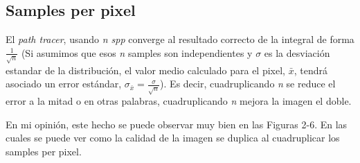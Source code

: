 \documentclass{article}
\begin{document}
\subsection{Samples per pixel}

El \textit{path tracer}, usando \textit{n spp} converge al resultado correcto de
la integral de forma \(\frac{1}{\sqrt{n}}\) (Si asumimos que esos \textit{n}
samples son independientes y \(\sigma\) es la desviación estandar de la
distribución, el valor medio calculado para el pixel, \(\bar{x}\), tendrá
asociado un error estándar, \(\sigma_{\bar{x}}=\frac{\sigma}{\sqrt{n}}\)). Es
decir, cuadruplicando \textit{n} se reduce el error a la mitad o en otras
palabras, cuadruplicando \textit{n} mejora la imagen el doble.

En mi opinión, este hecho se puede observar muy bien en las Figuras 2-6. En las
cuales se puede ver como la calidad de la imagen se duplica al cuadruplicar los
samples per pixel.
\end{document}
